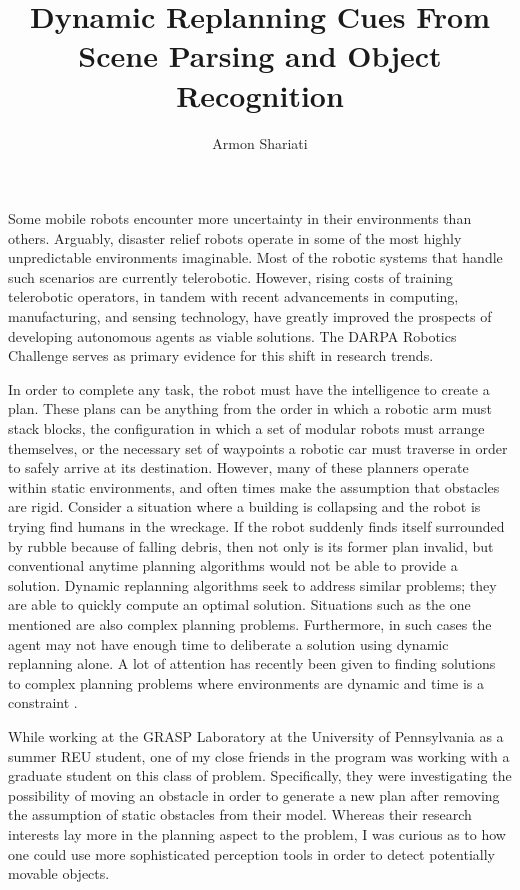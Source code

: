 \documentclass[12pt]{article}
\begin{document}
\author{Armon Shariati}
\title{Dynamic Replanning Cues From Scene Parsing and Object Recognition}
\date{}
\maketitle

Some mobile robots encounter more uncertainty in their environments than
others.  Arguably, disaster relief robots operate in some of the most highly
unpredictable environments imaginable. Most of the robotic systems that handle
such scenarios are currently telerobotic. However, rising costs of training
telerobotic operators, in tandem with recent advancements in computing,
manufacturing, and sensing technology, have greatly improved the prospects of
developing autonomous agents as viable solutions. The DARPA Robotics Challenge
serves as primary evidence for this shift in research trends.

In order to complete any task, the robot must have the intelligence to create a
plan. These plans can be anything from the order in which a robotic arm must
stack blocks, the configuration in which a set of modular robots must arrange
themselves, or the necessary set of waypoints a robotic car must traverse in
order to safely arrive at its destination. However, many of these planners
operate within static environments, and often times make the assumption that
obstacles are rigid. Consider a situation where a building is collapsing and
the robot is trying find humans in the wreckage. If the robot suddenly finds
itself surrounded by rubble because of falling debris, then not only is its
former plan invalid, but conventional anytime planning algorithms would not be
able to provide a solution. Dynamic replanning algorithms seek to address
similar problems; they are able to quickly compute an optimal solution.
Situations such as the one mentioned are also complex planning problems.
Furthermore, in such cases the agent may not have enough time to deliberate a
solution using dynamic replanning alone. A lot of attention has recently been
given to finding solutions to complex planning problems where environments are
dynamic and time is a constraint \cite{likhachev}.

While working at the GRASP Laboratory at the University of Pennsylvania as a
summer REU student, one of my close friends in the program was working with a
graduate student on this class of problem. Specifically, they were
investigating the possibility of moving an obstacle in order to generate a new
plan after removing the assumption of static obstacles from their model.
Whereas their research interests lay more in the planning aspect to the
problem, I was curious as to how one could use more sophisticated perception
tools in order to detect potentially movable objects.
\end{document}
